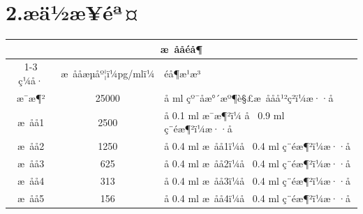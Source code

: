 \documentclass[UTF8,10pt,a4paper,fontset=fandol]{ctexart}
\newcommand{\fieldvalue}[1]{#1}
\newcommand{\handwritten}[1]{#1}
\begin{document}
\section*{2.\quad æä½æ­¥éª¤}

\begin{tabularx}{\textwidth}{|c|c|X|}
\hline
\multicolumn{3}{|c|}{æ ååéå¶} \\ \cline{1-3}
ç¼å· & æ ååæµåº¦ï¼pg/mlï¼ & éå¶æ¹æ³ \\ \hline
æ¯æ¶² & 25000 & å \underline{\hspace{0.5cm}} ml çº¯åæ°´æº¶è§£æ ååå¹²ç²ï¼æ··å \\ \hline
æ åå1 & 2500 &
å
\fieldvalue{\handwritten{0.1}} ml æ¯æ¶²ï¼
å 
\fieldvalue{\handwritten{0.9}} ml ç¨éæ¶²ï¼æ··å
\\ \hline
æ åå2 & 1250 &
å
\fieldvalue{\handwritten{0.4}} ml æ åå1ï¼å 
\fieldvalue{\handwritten{0.4}} ml ç¨éæ¶²ï¼æ··å
\\ \hline
æ åå3 & 625 &
å
\fieldvalue{\handwritten{0.4}} ml æ åå2ï¼å 
\fieldvalue{\handwritten{0.4}} ml ç¨éæ¶²ï¼æ··å
\\ \hline
æ åå4 & 313 &
å
\fieldvalue{\handwritten{0.4}} ml æ åå3ï¼å 
\fieldvalue{\handwritten{0.4}} ml ç¨éæ¶²ï¼æ··å
\\ \hline
æ åå5 & 156 &
å
\fieldvalue{\handwritten{0.4}} ml æ åå4ï¼å 
\fieldvalue{\handwritten{0.4}} ml ç¨éæ¶²ï¼æ··å

\end{tabularx}
\end{document}
